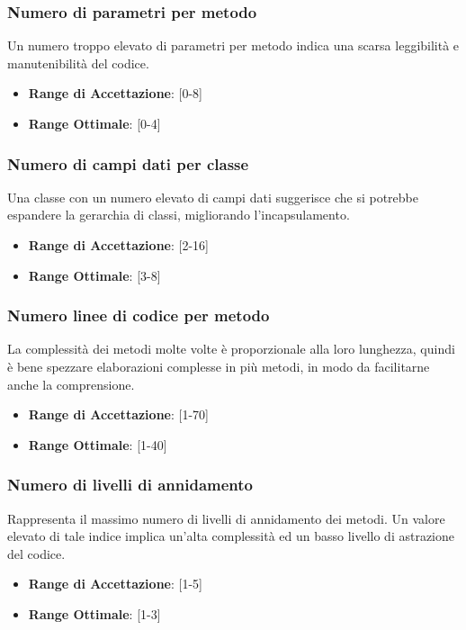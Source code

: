 \documentclass[12pt,a4paper]{article}
\begin{document}
	\subsubsection{Numero di parametri per metodo}
	Un numero troppo elevato di parametri per metodo indica una scarsa leggibilità e manutenibilità del codice.
	
	\begin{itemize}
		\item \textbf{Range di Accettazione}: [0-8]
		\item \textbf{Range Ottimale}: [0-4]
	\end{itemize}
	
	\subsubsection{Numero di campi dati per classe}
	Una classe con un numero elevato di campi dati suggerisce che si potrebbe espandere la gerarchia di classi, migliorando l'incapsulamento.
	
	\begin{itemize}
		\item \textbf{Range di Accettazione}: [2-16]
		\item \textbf{Range Ottimale}: [3-8]
	\end{itemize}
	
	\subsubsection{Numero linee di codice per metodo}
	La complessità dei metodi molte volte è proporzionale alla loro lunghezza, quindi è bene spezzare elaborazioni complesse in più metodi, in modo da facilitarne anche la comprensione.
	
	\begin{itemize}
		\item \textbf{Range di Accettazione}: [1-70]
		\item \textbf{Range Ottimale}: [1-40]
	\end{itemize}
	
	\subsubsection{Numero di livelli di annidamento}
	Rappresenta il massimo numero di livelli di annidamento dei metodi. Un valore elevato di tale indice implica un'alta complessità ed un basso livello di astrazione del codice.
	
	\begin{itemize}
		\item \textbf{Range di Accettazione}: [1-5]
		\item \textbf{Range Ottimale}: [1-3]
	\end{itemize}
	
\end{document}
